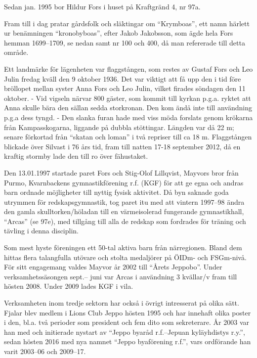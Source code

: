 Sedan jan. 1995 bor Hildur Fors i huset på Kraftgränd 4, nr 97a.


Fram till i dag pratar gårdsfolk och släktingar om ``Krymboas'', ett namn härlett ur benämningen ``kronobyboas'', efter Jakob Jakobsson, som ägde hela Fors hemman 1699--1709, se nedan samt nr 100 och 400, då man refererade till detta område.

Ett landmärke för lägenheten var flaggstången, som restes av Gustaf	Fors och Leo Julin fredag kväll den 9 oktober 1936. Det var viktigt att få upp den i tid före bröllopet mellan syster Anna Fors och Leo Julin, vilket firades söndagen den 11 oktober. - Vid vigseln närvar 800	gäster, som kommit till kyrkan p.g.a. ryktet att Anna skulle bära den	sällan sedda storkronan. Den kom ändå inte till användning p.g.a	dess tyngd. - Den slanka furan hade med viss möda forslats genom	krökarna från Kampasskogarna, liggande på dubbla stöttingar. Längden var då 22 m; senare förkortad från ``skatan och loman''  i två	repriser till ca 18 m. Flaggstången blickade över Silvast i 76 års tid,	fram till natten 17-18 september 2012, då en kraftig stormby lade den till ro över fähustaket.

Den 13.01.1997 startade paret Fors och Stig-Olof Lillqvist, Mayvors	bror från Purmo, Kvarnbackens gymnastikförening r.f. (KGF) för att ge	egna och andras barn ordnade möjligheter till nyttig fysisk aktivitet. Då byn saknade goda utrymmen för redskapsgymnastik, tog paret itu med att vintern 1997--98 ändra den gamla	skulltorken/höladan till en värmeisolerad fungerande gymnastikhall,	``Arcas'' (se 97e), med tillgång till alla de redskap som fordrades för träning och tävling i denna disciplin.


Som mest hyste föreningen ett 50-tal aktiva barn från närregionen. Bland dem hittas flera talangfulla utövare och stolta medaljörer på ÖIDm- och FSGm-nivå. För sitt engagemang valdes Mayvor år 2002 till ``Årets Jeppobo''. Under verksamhetssäsongen sept.-- juni var Arcas i användning 3 kvällar/v fram till hösten 2008. Under 2009 lades KGF i vila.

Verksamheten inom tredje sektorn har också i övrigt intresserat på olika sätt. Fjalar blev medlem i Lions Club Jeppo hösten 1995 och har innehaft olika poster i den, bl.a. två perioder som president och fem dito som sekreterare. År 2003 var han med och initierade	nystart av ``Jeppo byaråd r.f.--Jepuan kyläyhdistys r.y.'', sedan hösten 2016 med nya namnet ``Jeppo byaförening r.f.'', vars ordförande han varit 2003--06 och 2009--17.

